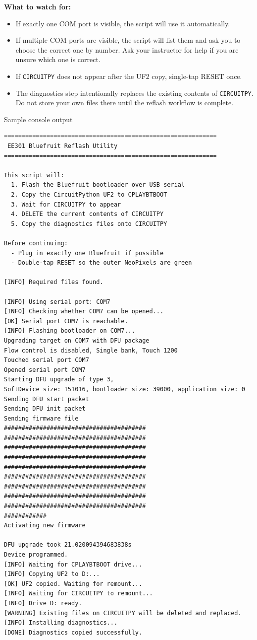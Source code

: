 \documentclass[11pt]{article}
\newcommand{\kit}[1]{\texttt{#1}}
\begin{document}
\textbf{What to watch for:}
\begin{itemize}
    \item If exactly one COM port is visible, the script will use it automatically.
    \item If multiple COM ports are visible, the script will list them and ask you to choose the correct one by number. Ask your instructor for help if you are unsure which one is correct.
    \item If \kit{CIRCUITPY} does not appear after the UF2 copy, single-tap RESET once.
    \item The diagnostics step intentionally replaces the existing contents of \kit{CIRCUITPY}. Do not store your own files there until the reflash workflow is complete.
\end{itemize}

\begin{calloutbox}{Sample console output}
\small
\begin{verbatim}
============================================================
 EE301 Bluefruit Reflash Utility
============================================================

This script will:
  1. Flash the Bluefruit bootloader over USB serial
  2. Copy the CircuitPython UF2 to CPLAYBTBOOT
  3. Wait for CIRCUITPY to appear
  4. DELETE the current contents of CIRCUITPY
  5. Copy the diagnostics files onto CIRCUITPY

Before continuing:
  - Plug in exactly one Bluefruit if possible
  - Double-tap RESET so the outer NeoPixels are green

[INFO] Required files found.

[INFO] Using serial port: COM7
[INFO] Checking whether COM7 can be opened...
[OK] Serial port COM7 is reachable.
[INFO] Flashing bootloader on COM7...
Upgrading target on COM7 with DFU package 
Flow control is disabled, Single bank, Touch 1200
Touched serial port COM7
Opened serial port COM7
Starting DFU upgrade of type 3, 
SoftDevice size: 151016, bootloader size: 39000, application size: 0
Sending DFU start packet
Sending DFU init packet
Sending firmware file
########################################
########################################
########################################
########################################
########################################
########################################
########################################
########################################
########################################
############
Activating new firmware

DFU upgrade took 21.020094394683838s
Device programmed.
[INFO] Waiting for CPLAYBTBOOT drive...
[INFO] Copying UF2 to D:...
[OK] UF2 copied. Waiting for remount...
[INFO] Waiting for CIRCUITPY to remount...
[INFO] Drive D: ready.
[WARNING] Existing files on CIRCUITPY will be deleted and replaced.
[INFO] Installing diagnostics...
[DONE] Diagnostics copied successfully.
\end{verbatim}
\end{calloutbox}
\end{document}
